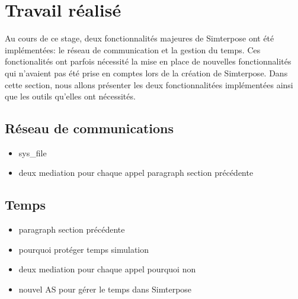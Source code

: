 \section{Travail réalisé}
\label{section:work}
Au cours de ce stage, deux fonctionnalités majeures de Simterpose ont été implémentées: le réseau de communication et la gestion du temps. Ces fonctionalités ont parfois nécessité la mise en place de nouvelles fonctionnalités qui n'avaient pas été prise en comptes lors de la création de Simterpose. Dans cette section, nous allons présenter les deux fonctionnalitées implémentées ainsi que les outils qu'elles ont nécessités.

\subsection{Réseau de communications}

\begin{itemize}
\item sys\_file
\item deux mediation pour chaque appel paragraph section précédente
\end{itemize}

\subsection{Temps}
\begin{itemize}
\item paragraph section précédente
\item pourquoi protéger temps simulation
\item deux mediation pour chaque appel pourquoi non
\item nouvel AS pour gérer le temps dans Simterpose
\end{itemize}
